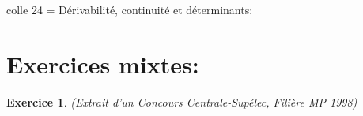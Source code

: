 \documentclass[a4paper,10pt]{article}
\theoremstyle{definition}
\theoremstyle{definition}
\newtheorem{exo}{Exercice}
\begin{document}
 	
	
	\begin{center}
		\Large \sc colle 24 =  Dérivabilité, continuité et déterminants: 
	\end{center}%

\section*{Exercices mixtes:}%

		\raggedright
		
		
		\begin{exo}\textit{(Extrait d'un Concours Centrale-Supélec, Filière MP 1998)}\quad\\[0.25cm]
				

\end{exo}
\end{document}
